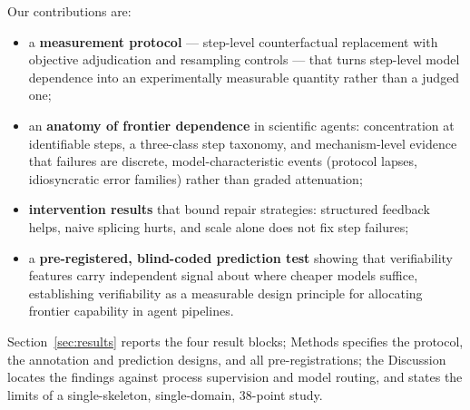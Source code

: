 Our contributions are:

\begin{itemize}
\item a \textbf{measurement protocol} --- step-level counterfactual replacement with objective adjudication and resampling controls --- that turns step-level model dependence into an experimentally measurable quantity rather than a judged one;
\item an \textbf{anatomy of frontier dependence} in scientific agents: concentration at identifiable steps, a three-class step taxonomy, and mechanism-level evidence that failures are discrete, model-characteristic events (protocol lapses, idiosyncratic error families) rather than graded attenuation;
\item \textbf{intervention results} that bound repair strategies: structured feedback helps, naive splicing hurts, and scale alone does not fix step failures;
\item a \textbf{pre-registered, blind-coded prediction test} showing that verifiability features carry independent signal about where cheaper models suffice, establishing verifiability as a measurable design principle for allocating frontier capability in agent pipelines.
\end{itemize}

Section~\ref{sec:results} reports the four result blocks; Methods specifies the protocol, the annotation and prediction designs, and all pre-registrations; the Discussion locates the findings against process supervision and model routing, and states the limits of a single-skeleton, single-domain, 38-point study.
